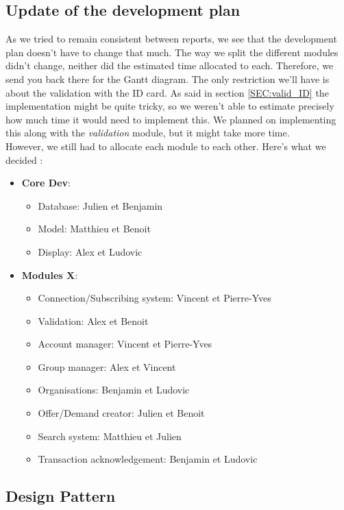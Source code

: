 \subsection{Update of the development plan}

As we tried to remain consistent between reports, we see that the development plan doesn't have to change that much.
The way we split the different modules didn't change, neither did the estimated time allocated to each.
Therefore, we send you back there for the Gantt diagram.
The only restriction we'll have is about the validation with the ID card.
As said in section \ref{SEC:valid_ID} the implementation might be quite tricky, so we weren't able to estimate precisely how much time it would need to implement this.
We planned on implementing this along with the \textit{validation} module, but it might take more time.\\

However, we still had to allocate each module to each other.
Here's what we decided :
\begin{itemize}
  \item \textbf{Core Dev}:
  \begin{itemize}
    \item Database: Julien et Benjamin
    \item Model: Matthieu et Benoit
    \item Display: Alex et Ludovic
  \end{itemize}
  \item \textbf{Modules X}:
  \begin{itemize}
    \item Connection/Subscribing system: Vincent et Pierre-Yves
    \item Validation: Alex et Benoit
    \item Account manager: Vincent et Pierre-Yves
    \item Group manager: Alex et Vincent
    \item Organisations: Benjamin et Ludovic
    \item Offer/Demand creator: Julien et Benoit
    \item Search system: Matthieu et Julien
    \item Transaction acknowledgement: Benjamin et Ludovic
  \end{itemize}
\end{itemize}

\subsection{Design Pattern}

